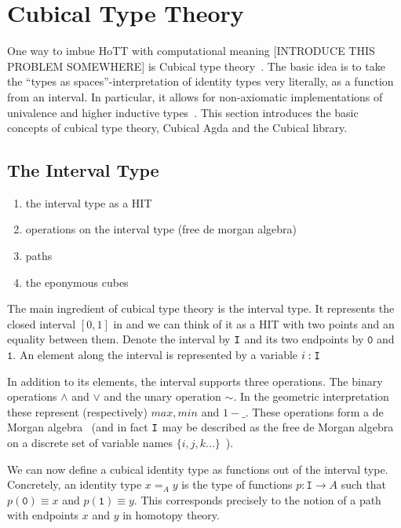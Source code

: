 \section{Cubical Type Theory}

One way to imbue HoTT with computational meaning [INTRODUCE THIS PROBLEM
SOMEWHERE] is Cubical type theory~\cite{cohen2016cubical}. The basic idea is to
take the ``types as spaces''-interpretation of identity types very literally, as
a function from an interval. In particular, it allows for non-axiomatic
implementations of univalence and higher inductive types~\cite{coquand2018higher}. This section
introduces the basic concepts of cubical type theory, Cubical Agda and the
Cubical library.

\subsection{The Interval Type}\label{sec:interval-type}
\begin{enumerate}
  \item the interval type as a HIT
  \item operations on the interval type (free de morgan algebra)
  \item paths
  \item the eponymous cubes
\end{enumerate}

The main ingredient of cubical type theory is the interval type. It represents
the closed interval $[0,1]$ in and we can think of it as a HIT with two points
and an equality between them. Denote the interval by $\texttt{I}$ and its two
endpoints by $\texttt{0}$ and $\texttt{1}$. An element along the interval is
represented by a variable $i : \texttt{I}$

In addition to its elements, the interval supports three operations. The binary
operations $\land$ and $\lor$ and the unary operation $\sim$. In the geometric
interpretation these represent (respectively) $max, min$ and $1 - \_$. These
operations form a de Morgan algebra~\cite{mortberg2020cubical} (and in fact
$\texttt{I}$ may be described as the free de Morgan algebra on a discrete set of
variable names $\{i, j, k ...\}$~\cite{cohen2016cubical}).

We can now define a cubical identity type as functions out of the interval type.
Concretely, an identity type $x =_A y$ is the type of functions $p : \texttt{I}
\rightarrow A$ such that $p(\texttt{0}) \equiv x$ and $p(\texttt{1}) \equiv y$.
This corresponds precisely to the notion of a path with endpoints $x$ and $y$ in
homotopy theory.

